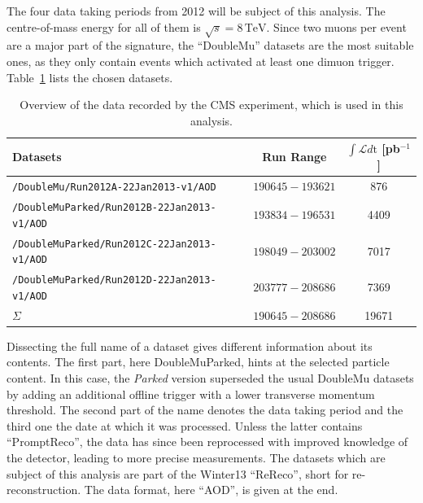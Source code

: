 The four data taking periods from 2012 will be subject of this analysis. The centre-of-mass energy for all of them is $\sqrt{s} = 8\,\text{TeV}$. Since two muons per event are a major part of the signature, the ``DoubleMu'' datasets are the most suitable ones, as they only contain events which activated at least one dimuon trigger. Table~\ref{tab:data} lists the chosen datasets.

\begin{table}[!ht]
  \centering
  \begin{tabular}{|l|c|c|}
    \hline
    Datasets                                         & Run Range         & $\int \mathcal{L} d\text{t}$ [pb$^{-1}$] \\ \hline \hline
    \verb+/DoubleMu/Run2012A-22Jan2013-v1/AOD+\footnotemark       & $190645 - 193621$ & 876                            \\ \hline
    \verb+/DoubleMuParked/Run2012B-22Jan2013-v1/AOD+ & $193834 - 196531$ & 4409                           \\ \hline
    \verb+/DoubleMuParked/Run2012C-22Jan2013-v1/AOD+ & $198049 - 203002$ & 7017                           \\ \hline
    \verb+/DoubleMuParked/Run2012D-22Jan2013-v1/AOD+ & $203777 - 208686$ & 7369                           \\ \hline
    $\Sigma$                                         & $190645 - 208686$ & 19671                          \\ \hline
  \end{tabular}
  \caption{Overview of the data recorded by the CMS experiment, which is used in this analysis.}
  \label{tab:data}
\end{table}


Dissecting the full name of a dataset gives different information about its contents. The first part, here DoubleMuParked, hints at the selected particle content. In this case, the \textit{Parked} version superseded the usual DoubleMu datasets by adding an additional offline trigger with a lower transverse momentum threshold. The second part of the name denotes the data taking period and the third one the date at which it was processed. Unless the latter contains ``PromptReco'', the data has since been reprocessed with improved knowledge of the detector, leading to more precise measurements. The datasets which are subject of this analysis are part of the Winter13 ``ReReco'', short for re-reconstruction. The data format, here ``AOD'', is given at the end.

